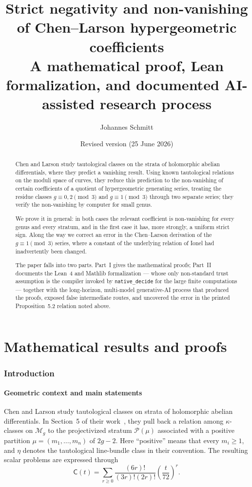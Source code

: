 \documentclass[11pt]{article}
\title{Strict negativity and non-vanishing of Chen--Larson hypergeometric coefficients\\[0.45em]
\large A mathematical proof, Lean formalization, and documented AI-assisted research process}
\author{Johannes Schmitt}
\date{Revised version (25 June 2026)}
\theoremstyle{definition}
\theoremstyle{remark}
\newcommand{\C}{\mathsf C}
\newcommand{\code}[1]{\texttt{#1}}
\begin{document}
\maketitle

\begin{abstract}
Chen and Larson study tautological classes on the strata of holomorphic
abelian differentials, where they predict a vanishing result.  Using known
tautological relations on the moduli space of curves, they reduce this
prediction to the non-vanishing of certain coefficients of a quotient of
hypergeometric generating series, treating the residue classes
$g\equiv0,2\pmod3$ and $g\equiv1\pmod3$ through two separate series; they verify
the non-vanishing by computer for small genus.

We prove it in general: in both cases the relevant coefficient is non-vanishing
for every genus and every stratum, and in the first case it has, more strongly,
a uniform strict sign.  Along the way we correct an error in the Chen--Larson
derivation of the $g\equiv1\pmod3$ series, where a constant of the underlying
relation of Ionel had inadvertently been changed.

The paper falls into two parts.  Part~I gives the mathematical proofs; Part~II
documents the Lean~4 and Mathlib formalization --- whose only non-standard trust
assumption is the compiler invoked by \code{native\_decide} for the large finite
computations --- together with the long-horizon, multi-model generative-AI
process that produced the proofs, exposed false intermediate routes, and
uncovered the error in the printed Proposition~5.2 relation noted above.
\end{abstract}

\tableofcontents

\part{Mathematical results and proofs}\label{part:mathematics}

\section{Introduction}

\subsection{Geometric context and main statements}

Chen and Larson study tautological classes on strata of holomorphic abelian
differentials.  In Section~5 of their work~\cite{ChenLarson}, they pull back a
relation among $\kappa$-classes on $\mathcal M_g$ to the projectivized stratum
$\mathcal P(\mu)$ associated with a positive partition
$\mu=(m_1,\ldots,m_n)$ of $2g-2$.  Here ``positive'' means that every
$m_i\ge1$, and $\eta$ denotes the tautological line-bundle class in their
convention.  The resulting scalar problems are expressed through
\begin{equation}\label{eq:CL-series-intro}
  \C(t)=\sum_{r\ge0}\frac{(6r)!}{(3r)!(2r)!}
                   \left(\frac{t}{72}\right)^r.
\end{equation}
\end{document}
